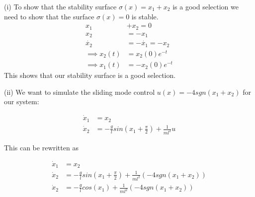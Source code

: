 \documentclass{article}
\begin{document}
  (i) To show that the stability surface $\sigma (x) = x_1 + x_2$ is a good
  selection we need to show that the surface $\sigma (x) = 0$ is stable.
  \begin{align*}
    x_1 &+ x_2 = 0 \\
    x_2 &= -x_1 \\
    \dot{x_2} &= -\dot{x_1} = -x_2 \\
    \implies x_2(t) &= x_2(0)e^{-t} \\
    \implies x_1(t) &= -x_2(0)e^{-t}
  \end{align*}
  This shows that our stability surface is a good selection. \newline \newline

  (ii) We want to simulate the sliding mode control $u(x) = -4sgn(x_1 + x_2)$
  for our system:
  
  \begin{align*}
    \dot{x}_1 &= x_2 \\
    \dot{x}_2 &= -\frac{g}{l}sin(x_1 + \frac{\pi}{2}) + \frac{1}{ml^2}u
  \end{align*}

  This can be rewritten as

  \begin{align*}
    \dot{x}_1 &= x_2 \\
    \dot{x}_2 &= -\frac{g}{l}sin(x_1 + \frac{\pi}{2}) + \frac{1}{ml^2}(-4sgn(x_1 + x_2)) \\
    \dot{x}_2 &= -\frac{g}{l}cos(x_1) + \frac{1}{ml^2}(-4sgn(x_1 + x_2))
  \end{align*}
   
   
  
\end{document}

